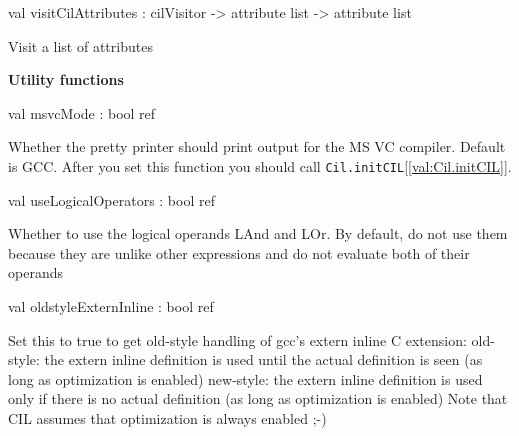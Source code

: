 \documentclass[11pt]{article}
\begin{document}
\label{val:Cil.visitCilAttributes}\begin{ocamldoccode}
val visitCilAttributes : cilVisitor -> attribute list -> attribute list
\end{ocamldoccode}
\begin{ocamldocdescription}
Visit a list of attributes


\end{ocamldocdescription}




{\bf Utility functions}



\label{val:Cil.msvcMode}\begin{ocamldoccode}
val msvcMode : bool ref
\end{ocamldoccode}
\begin{ocamldocdescription}
Whether the pretty printer should print output for the MS VC compiler.
   Default is GCC. After you set this function you should call {\tt{Cil.initCIL}}[\ref{val:Cil.initCIL}].


\end{ocamldocdescription}




\label{val:Cil.useLogicalOperators}\begin{ocamldoccode}
val useLogicalOperators : bool ref
\end{ocamldoccode}
\begin{ocamldocdescription}
Whether to use the logical operands LAnd and LOr. By default, do not use 
 them because they are unlike other expressions and do not evaluate both of 
 their operands


\end{ocamldocdescription}




\label{val:Cil.oldstyleExternInline}\begin{ocamldoccode}
val oldstyleExternInline : bool ref
\end{ocamldoccode}
\begin{ocamldocdescription}
Set this to true to get old-style handling of gcc's extern inline C extension:
   old-style: the extern inline definition is used until the actual definition is
     seen (as long as optimization is enabled)
   new-style: the extern inline definition is used only if there is no actual
     definition (as long as optimization is enabled)
   Note that CIL assumes that optimization is always enabled ;-)


\end{ocamldocdescription}
\end{document}

